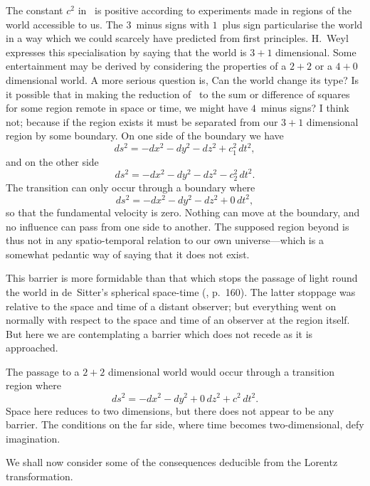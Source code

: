 \documentclass[12pt]{book}
\begin{document}
The constant $c^{2}$ in~ is positive according to experiments made in
regions of the world accessible to us. The $3$~minus signs with $1$~plus sign
particularise the world in a way which we could scarcely have predicted from
first principles. H.~Weyl expresses this specialisation by saying that the world
is $3 + 1$ dimensional. Some entertainment may be derived by considering the
properties of a $2 + 2$ or a $4 + 0$ dimensional world. A more serious question
is, Can the world change its type? Is it possible that in making the reduction
of~ to the sum or difference of squares for some region remote in space or
time, we might have $4$~minus signs? I think not; because if the region exists
it must be separated from our $3 + 1$ dimensional region by some boundary.
On one side of the boundary we have
\[
ds^{2} = -dx^{2} - dy^{2} - dz^{2} + c_{1}^{2}\, dt^{2},
\]
and on the other side
\[
ds^{2} = -dx^{2} - dy^{2} - dz^{2} - c_{2}^{2}\, dt^{2}.
\]
The transition can only occur through a boundary where
\[
ds^{2} = -dx^{2} - dy^{2} - dz^{2} + 0\, dt^{2},
\]
so that the fundamental velocity is zero. Nothing can move at the boundary,
and no influence can pass from one side to another. The supposed region
beyond is thus not in any spatio-temporal relation to our own universe---which
is a somewhat pedantic way of saying that it does not exist.

This barrier is more formidable than that which stops the passage of light
round the world in de~Sitter's spherical space-time (,
p.~160). The latter stoppage was relative to the space and time of a
distant observer; but everything went on normally with respect to the space
and time of an observer at the region itself. But here we are contemplating
a barrier which does not recede as it is approached.

The passage to a $2 + 2$ dimensional world would occur through a transition
region where
\[
ds^{2} = -dx^{2} - dy^{2} + 0\, dz^{2} + c^{2}\, dt^{2}.
\]
Space here reduces to two dimensions, but there does not appear to be any
%
barrier. The conditions on the far side, where time becomes two-dimensional,
defy imagination.

%
%

We shall now consider some of the consequences deducible from the
Lorentz transformation.
%
\end{document}
